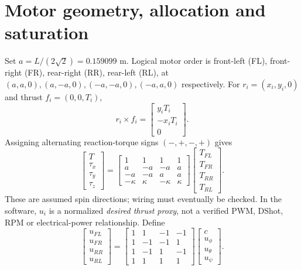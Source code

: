 \section{Motor geometry, allocation and saturation}
Set $a=L/(2\sqrt2)=0.159099$ m. Logical motor order is front-left (FL),
front-right (FR), rear-right (RR), rear-left (RL), at
$(a,a,0),(a,-a,0),(-a,-a,0),(-a,a,0)$ respectively. For
$r_i=(x_i,y_i,0)$ and thrust $f_i=(0,0,T_i)$,
\begin{equation}
r_i\times f_i=\begin{bmatrix}y_iT_i\\-x_iT_i\\0\end{bmatrix}.
\end{equation}
Assigning alternating reaction-torque signs $(-,+,-,+)$ gives
\begin{equation}
\begin{bmatrix}T\\\tau_x\\\tau_y\\\tau_z\end{bmatrix}
=\begin{bmatrix}1&1&1&1\\a&-a&-a&a\\-a&-a&a&a\\-\kappa&\kappa&-\kappa&\kappa\end{bmatrix}
\begin{bmatrix}T_{FL}\\T_{FR}\\T_{RR}\\T_{RL}\end{bmatrix}.
\end{equation}
These are assumed spin directions; wiring must eventually be checked. In the
software, $u_i$ is a normalized \emph{desired thrust proxy}, not a verified PWM,
DShot, RPM or electrical-power relationship. Define
\begin{equation}
\begin{bmatrix}u_{FL}\\u_{FR}\\u_{RR}\\u_{RL}\end{bmatrix}
=\begin{bmatrix}1&1&-1&-1\\1&-1&-1&1\\1&-1&1&-1\\1&1&1&1\end{bmatrix}
\begin{bmatrix}c\\u_\phi\\u_\theta\\u_\psi\end{bmatrix}.
\end{equation}
